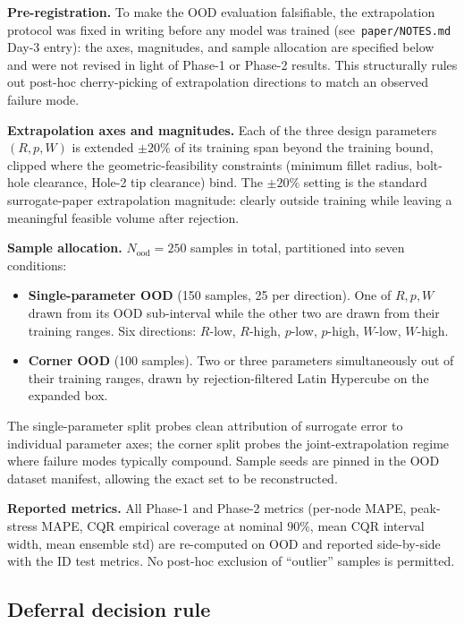 \documentclass[11pt]{article}
\begin{document}
\textbf{Pre-registration.} To make the OOD evaluation falsifiable, the
extrapolation protocol was fixed in writing before any model was trained
(see~\texttt{paper/NOTES.md} Day-3 entry): the axes, magnitudes, and sample
allocation are specified below and were not revised in light of Phase-1 or
Phase-2 results. This structurally rules out post-hoc cherry-picking of
extrapolation directions to match an observed failure mode.

\textbf{Extrapolation axes and magnitudes.} Each of the three design
parameters $(R, p, W)$ is extended $\pm 20\%$ of its training span beyond
the training bound, clipped where the geometric-feasibility constraints
(minimum fillet radius, bolt-hole clearance, Hole-2 tip clearance) bind.
The $\pm 20\%$ setting is the standard surrogate-paper extrapolation
magnitude: clearly outside training while leaving a meaningful feasible
volume after rejection.

\textbf{Sample allocation.} $N_{\mathrm{ood}} = 250$ samples in total,
partitioned into seven conditions:
\begin{itemize}
  \item \textbf{Single-parameter OOD} (150 samples, 25 per direction).
    One of $R, p, W$ drawn from its OOD sub-interval while the other two
    are drawn from their training ranges. Six directions: $R$-low, $R$-high,
    $p$-low, $p$-high, $W$-low, $W$-high.
  \item \textbf{Corner OOD} (100 samples). Two or three parameters
    simultaneously out of their training ranges, drawn by rejection-filtered
    Latin Hypercube on the expanded box.
\end{itemize}
The single-parameter split probes clean attribution of surrogate error to
individual parameter axes; the corner split probes the joint-extrapolation
regime where failure modes typically compound. Sample seeds are pinned in
the OOD dataset manifest, allowing the exact set to be reconstructed.

\textbf{Reported metrics.} All Phase-1 and Phase-2 metrics (per-node MAPE,
peak-stress MAPE, CQR empirical coverage at nominal $90\%$, mean CQR
interval width, mean ensemble std) are re-computed on OOD and reported
side-by-side with the ID test metrics. No post-hoc exclusion of ``outlier''
samples is permitted.

\subsection{Deferral decision rule}
\label{ssec:deferral}
\end{document}
